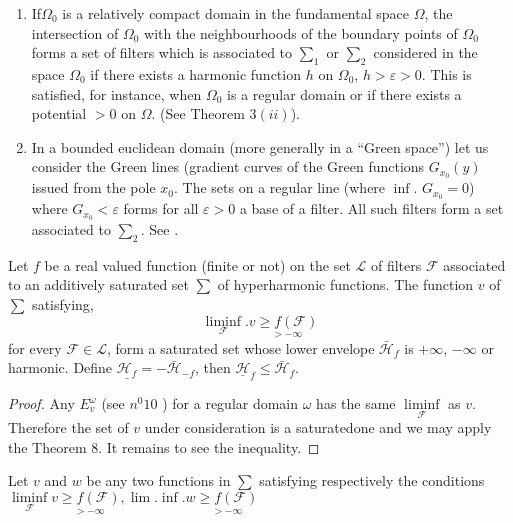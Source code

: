 \begin{enumerate}[1)]
\item If\pageoriginale $\Omega_0$ is a relatively compact domain in the fundamental
  space $\Omega$, the intersection of $\Omega_0$ with the
  neighbourhoods of the boundary points of $\Omega_0$ forms a set of
  filters which is associated to $\sum_1$ or $\sum_2$ considered in
  the space $\Omega_0$ if there exists a harmonic function $h$ on
  $\Omega_0$, $h > \varepsilon > 0$. This is satisfied, for instance,
  when $\Omega_0$ is a regular domain or if there exists a potential
  $> 0$ on $\Omega$. (See Theorem $3 (ii)$). 
\item In a bounded euclidean domain (more generally in a ``Green
  space'') let us consider the Green lines (gradient curves of the
  Green functions $G_{x_0}(y)$ issued from the pole $x_0$. The sets on
  a regular line (where $\inf$. $G_{x_0} = 0$) where $G_{x_0} <
  \varepsilon$ forms for all $\varepsilon > 0$ a base of a filter. All
  such filters form a set associated to $\sum_2$. See \cite{2}. 
\end{enumerate}

\setcounter{thm}{15}
\begin{thm}\label{p4:chap5:sec22:thm16} %
  Let $f$ be a real valued function (finite or not) on the set
  $\mathscr{L}$ of filters $\mathscr{F}$ associated to an additively
  saturated set $\sum$ of hyperharmonic functions. The function $v$ of
  $\sum$ satisfying,  
  $$
  \liminf_{\mathscr{F}}. v {\underset{> - \infty}{\ge f(\mathscr{F})}}
  $$
  for every $\mathscr{F} \in \mathscr{L}$, form a saturated set whose
  lower envelope $\bar{\mathscr{H}}_f$ is $+ \infty$, $- \infty$ or
  harmonic. Define $\underline{\mathscr{H}_f}= - \bar{\mathscr{H}}_{-f}$,
  then $\underline{\mathscr{H}}_f \le \bar{\mathscr{H}}_f$.  
\end{thm}

\begin{proof}
  Any $E^\omega_v$ (see $n^0 10$ ) for a regular domain $\omega $ has
  the same $\liminf \limits_{\mathscr{F}}$ as $v$. Therefore the set
  of $v$ under consideration is a saturated\pageoriginale one and we may apply the
  Theorem $8$. It remains to see the inequality. 
\end{proof}

Let $v$ and $w$ be any two functions in $\sum$ satisfying respectively
the conditions $\liminf \limits_{\mathscr{F}} v {\underset{> -
    \infty}{\ge f(\mathscr{F})}}, \lim.  \inf. w {\underset{> -
    \infty}{\ge f(\mathscr{F})}}$ 

